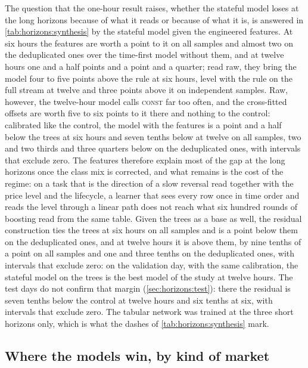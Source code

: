 The question that the one-hour result raises, whether the stateful model loses at the long
horizons because of what it reads or because of what it is, is answered in
\cref{tab:horizons:synthesis} by the stateful model given the engineered features.  At
six hours the features are worth a point to it on all samples and almost two on the
deduplicated ones over the time-first model without them, and at twelve hours one and a
half points and a point and a quarter; read raw, they bring the model four to five points
above the rule at six hours, level with the rule on the full stream at twelve and three
points above it on independent samples.  Raw, however, the twelve-hour model calls
\textsc{const} far too often, and the cross-fitted offsets are worth five to six points to
it there and nothing to the control: calibrated like the control, the model with the
features is a point and a half below the trees at six hours
and seven tenths below at twelve on all samples, two and two thirds and three quarters below
on the deduplicated ones, with intervals that exclude zero.  The features therefore explain
most of the gap at the long horizons once the class mix is corrected, and what remains is
the cost of the regime: on a task that is the direction of a slow reversal read together
with the price level and the lifecycle, a learner that sees every row once in time order
and reads the level through a linear path does not reach what six hundred rounds of
boosting read from the same table.  Given the trees as a base as well, the residual
construction ties the trees at six hours on all samples and is a point below them on the
deduplicated ones, and at twelve hours it is above them, by nine tenths of a point on all
samples and one and three tenths on the deduplicated ones, with intervals that exclude
zero: on the validation day, with the same calibration, the stateful model on the trees is
the best model of the study at twelve hours.  The test days do not confirm that margin
(\cref{sec:horizons:test}): there the residual is seven tenths below the control at twelve
hours and six tenths at six, with intervals that exclude zero.  The tabular network was
trained at the three short horizons only, which is what the dashes of
\cref{tab:horizons:synthesis} mark.

\subsection{Where the models win, by kind of market}
\label{sec:horizons:where}
\label{sec:analysis:where}

